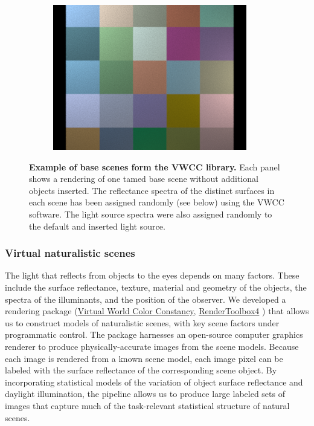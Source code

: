 \documentclass{jov}
\begin{document}
\begin{figure}[t]
\begin{subfigure}[b]{0.22 \textwidth}
        \includegraphics[width=\textwidth]{../FiguresDraft4/Figure3/Figure3_f.png}
        \label{fig:baseSceneCheckerBoard}
    \end{subfigure}
    \caption{{\bf Example of base scenes form the VWCC library.} Each panel shows a rendering of one tamed base scene without additional objects inserted.  The reflectance spectra of the distinct surfaces in each scene has been assigned randomly (see below) using the VWCC software.  The light source spectra were also assigned randomly to the default and inserted light source.}\label{fig:baseScenes}
\end{figure}

\subsubsection{Virtual naturalistic scenes}

The light that reflects from objects to the eyes depends on many factors.
These include the surface reflectance, texture, material and geometry of the objects, the spectra of the illuminants, and the position of the observer.
We developed a rendering package (\href{https://github.com/BrainardLab/VirtualWorldColorConstancy}{Virtual World Color Constancy}, \href{http://rendertoolbox.org}{RenderToolbox4} \cite{heasly2014rendertoolbox3}) that allows us to construct models of naturalistic scenes, with key scene factors under programmatic control.
The package harnesses an open-source computer graphics renderer  \cite{jakob2015mitsuba} to produce physically-accurate images from the scene models.
Because each image is rendered from a known scene model, each image pixel can be labeled with the surface reflectance of the corresponding scene object.
By incorporating statistical models of the variation of object surface reflectance and daylight illumination, the pipeline allows us to produce large labeled sets of images that capture much of the task-relevant statistical structure of natural scenes.
\end{document}
